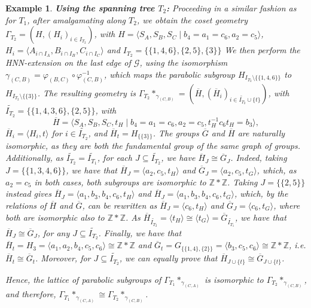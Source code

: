 \documentclass[11pt,letterpaper]{amsart}
\newtheorem{example}[prop]{Example}
\newcommand{\GG}{\mathcal{G}}
\newcommand{\ZZ}{\mathbb{Z}}
\begin{document}
\begin{example}
\textbf{Using the spanning tree $T_2$:} Proceeding in a similar fashion as for $T_1$, after amalgamating along $T_2$, we obtain the coset geometry $\Gamma_{T_2}=(H,(H_i)_{i\in I_{T_2}})$, with $H=\langle S_A, S_B, S_C\mid b_4 = a_1 = c_6, a_2=c_{5}\rangle$, $H_i=\langle A_{i\cap I_A}, B_{i\cap I_B}, C_{i\cap I_C}\rangle$ and $I_{T_2}=\{\{1,4,6\},\{2,5\},\{3\}\}$
We then perform the HNN-extension on the last edge of $\GG$, using the isomorphism $\gamma_{(C,B)}=\varphi_{(B,C)}\circ\varphi_{(C,B)}^{-1}$, which maps the parabolic subgroup $H_{I_{T_2}\setminus\{\{1,4,6\}\}}$ to $H_{I_{T_2}\setminus\{\{3\}\}}$.
The resulting geometry is $\Gamma_{T_2}*_{\gamma_{(C,B)}}=(\overline{H},(\overline{H}_i)_{i\in \widetilde{I_{T_2}}\cup \{t\}})$, with $\widetilde{I_{T_2}}= \{\{1,4,3,6\},\{2,5\}\}$, with $$\overline{H}=\langle S_A, S_B, S_C,t_H \mid b_4 = a_1 = c_6, a_2=c_{5},  t_H^{-1}c_{6}t_H=b_3\rangle,$$ $\overline{H}_i=\langle H_i,t\rangle$ for $i\in \widetilde{I_{T_2}}$, and $\overline{H}_t=H_{\{\{3\}\}}$.
The groups $\overline{G}$ and $\overline{H}$ are naturally isomorphic, as they are both the fundamental group of the same graph of groups. Additionally, as $\widetilde{I_{T_2}}=\widetilde{I_{T_1}}$, for each $J\subseteq \widetilde{I_{T_2}}$, we have $\overline{H}_J\cong\overline{G}_J$. 
Indeed, taking $J=\{\{1,3,4,6\}\}$, we have that $\overline{H}_J=\langle  a_2, c_5, t_H\rangle$ and $\overline{G}_J=\langle a_2, c_5, t_G\rangle$, which, as $a_2=c_5$ in both cases, both subgroups are isomorphic to $\ZZ*\ZZ$. Taking $J=\{\{2,5\}\}$ instead gives $\overline{H}_J = \langle a_1,b_3,b_4,c_6,t_H\rangle$ and $\overline{H}_J = \langle a_1,b_3,b_4,c_6,t_G\rangle$, which, by the relations of $\overline{H}$ and $\overline{G}$, can be rewritten as $\overline{H}_J = \langle c_6,t_H\rangle$  and $\overline{G}_J = \langle c_6,t_G\rangle$, where both are isomorphic also to $\ZZ*\ZZ$. As $\overline{H}_{\widetilde{I_{T_2}}}=\langle t_H\rangle \cong \langle t_G\rangle = \overline{G}_{\widetilde{I_{T_1}}}$, we have that $\overline{H}_J \cong \overline{G}_J$, for any $J\subseteq \widetilde{I_{T_2}}$. Finally, we have that $\overline{H}_t = H_3 = \langle a_1, a_2, b_4, c_5, c_6\rangle\cong \ZZ*\ZZ$ and $\overline{G}_t = G_{\{\{1,4\},\{2\}\}} = \langle b_3, c_5, c_6\rangle\cong \ZZ*\ZZ$, i.e. $\overline{H}_t\cong \overline{G}_t$. Moreover, for $J\subseteq \widetilde{I_{T_2}}$, we can equally prove that $\overline{H}_{J\cup \{t\}}\cong\overline{G}_{J\cup \{t\}}$.

Hence, the lattice of parabolic subgroups of $\Gamma_{T_1}*_{\gamma_{(C,A)}}$ is isomorphic to $\Gamma_{T_2}*_{\gamma_{(C,B)}}$, and therefore, $\Gamma_{T_1}*_{\gamma_{(C,A)}}\cong \Gamma_{T_2}*_{\gamma_{(C,B)}}$.


\end{example}
\end{document}
